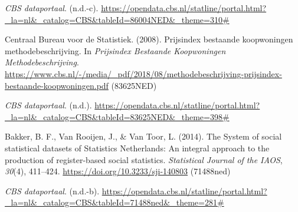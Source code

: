 \documentclass[
]{article}
\begin{document}
\emph{CBS dataportaal}. (n.d.-c).
\url{https://opendata.cbs.nl/statline/portal.html?_la=nl&_catalog=CBS&tableId=86004NED&_theme=310\#}

Centraal Bureau voor de Statistiek. (2008). Prijsindex bestaande
koopwoningen methodebeschrijving. In \emph{Prijsindex Bestaande
Koopwoningen Methodebeschrijving}.
\url{https://www.cbs.nl/-/media/_pdf/2018/08/methodebeschrijving-prijsindex-bestaande-koopwoningen.pdf}
(83625NED)

\emph{CBS dataportaal}. (n.d.).
\url{https://opendata.cbs.nl/statline/portal.html?_la=nl&_catalog=CBS&tableId=83625NED&_theme=398\#}

Bakker, B. F., Van Rooijen, J., \& Van Toor, L. (2014). The System of
social statistical datasets of Statistics Netherlands: An integral
approach to the production of register-based social statistics.
\emph{Statistical Journal of the IAOS}, \emph{30}(4), 411--424.
\url{https://doi.org/10.3233/sji-140803} (71488ned)

\emph{CBS dataportaal}. (n.d.-b).
\url{https://opendata.cbs.nl/statline/portal.html?_la=nl&_catalog=CBS&tableId=71488ned&_theme=281\#}
\end{document}
